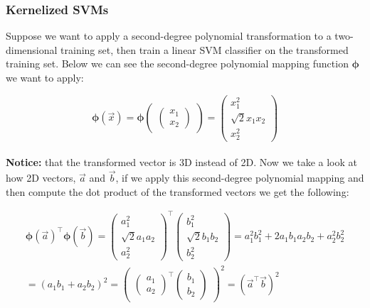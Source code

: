 \subsubsection*{Kernelized SVMs}

Suppose we want to apply a second-degree polynomial transformation to a two-dimensional training set, then train a 
linear SVM classifier on the transformed training set. Below we can see the second-degree polynomial mapping 
function $\boldsymbol{\phi}$ we want to apply:

$$\boldsymbol{\phi}(\vec{x}) = 
\boldsymbol{\phi}
\begin{pmatrix}
    \begin{pmatrix}
        x_{1} \\
        x_{2}
    \end{pmatrix}
\end{pmatrix}
= 
\begin{pmatrix}
    x_{1}^{2} \\
    \sqrt{2}x_{1}x_{2} \\
    x_{2}^{2}
\end{pmatrix}
$$ \\

\noindent
\textbf{Notice:} that the transformed vector is 3D instead of 2D. Now we take a look at how 2D vectors, $\vec{a}$ and 
$\vec{b}$, if we apply this second-degree polynomial mapping and then compute the dot product of the transformed 
vectors we get the following:

\[
\begin{aligned}
\boldsymbol{\phi}(\vec{a})^{\intercal}\boldsymbol{\phi}(\vec{b}) = 
\begin{pmatrix}
    a_{1}^{2} \\
    \sqrt{2}a_{1}a_{2} \\
    a_{2}^{2}
\end{pmatrix}
^{\intercal}
\begin{pmatrix}
    b_{1}^{2} \\
    \sqrt{2}b_{1}b_{2} \\
    b_{2}^{2}
\end{pmatrix}
=
a_{1}^{2}b_{1}^{2} + 2a_{1}b_{1}a_{2}b_{2} + a_{2}^{2} b_{2}^{2}\\
= (a_{1}b_{1} + a_{2}b_{2})^{2} = 
\begin{pmatrix}
    \begin{pmatrix}
        a_{1}\\
        a_{2}
    \end{pmatrix}
    ^{\intercal}
    \begin{pmatrix}
        b_{1} \\
        b_{2}
    \end{pmatrix}
\end{pmatrix}
^{2} = 
(\vec{a}^{\intercal}\vec{b})^{2}
\end{aligned}
\]

